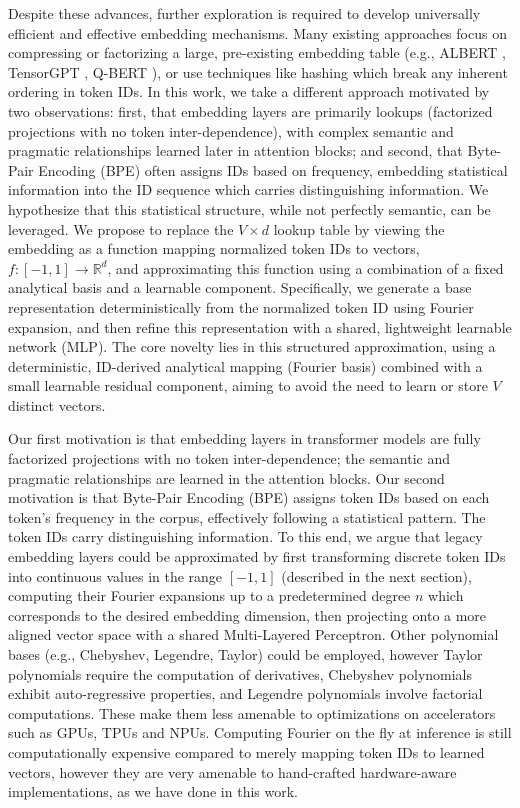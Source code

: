 \documentclass{article}
\begin{document}
Despite these advances, further exploration is required to develop universally efficient and effective embedding mechanisms. Many existing approaches focus on compressing or factorizing a large, pre-existing embedding table (e.g., ALBERT \cite{lan2019albert}, TensorGPT \cite{xu2023tensorgpt}, Q-BERT \cite{shen2020qbert}), or use techniques like hashing \cite{svenstrup2017hash} which break any inherent ordering in token IDs. In this work, we take a different approach motivated by two observations: first, that embedding layers are primarily lookups (factorized projections with no token inter-dependence), with complex semantic and pragmatic relationships learned later in attention blocks; and second, that Byte-Pair Encoding (BPE) often assigns IDs based on frequency, embedding statistical information into the ID sequence which carries distinguishing information. We hypothesize that this statistical structure, while not perfectly semantic, can be leveraged. We propose to replace the \(V \times d\) lookup table by viewing the embedding as a function mapping normalized token IDs to vectors, \(f: [-1, 1] \to \mathbb{R}^d\), and approximating this function using a combination of a fixed analytical basis and a learnable component. Specifically, we generate a base representation deterministically from the normalized token ID using Fourier expansion, and then refine this representation with a shared, lightweight learnable network (MLP). The core novelty lies in this structured approximation, using a deterministic, ID-derived analytical mapping (Fourier basis) combined with a small learnable residual component, aiming to avoid the need to learn or store \(V\) distinct vectors.

Our first motivation is that embedding layers in transformer models are fully factorized projections with no token inter-dependence; the semantic and pragmatic relationships are learned in the attention blocks. Our second motivation is that Byte-Pair Encoding (BPE) assigns token IDs based on each token's frequency in the corpus, effectively following a statistical pattern. The token IDs carry distinguishing information. To this end, we argue that legacy embedding layers could be approximated by first transforming discrete token IDs into continuous values in the range \([-1, 1]\) (described in the next section), computing their Fourier expansions up to a predetermined degree \(n\) which corresponds to the desired embedding dimension, then projecting onto a more aligned vector space with a shared Multi-Layered Perceptron. Other polynomial bases (e.g., Chebyshev, Legendre, Taylor) could be employed, however Taylor polynomials require the computation of derivatives, Chebyshev polynomials exhibit auto-regressive properties, and Legendre polynomials involve factorial computations. These make them less amenable to optimizations on accelerators such as GPUs, TPUs and NPUs. Computing Fourier on the fly at inference is still computationally expensive compared to merely mapping token IDs to learned vectors, however they are very amenable to hand-crafted hardware-aware implementations, as we have done in this work. 
\end{document}
